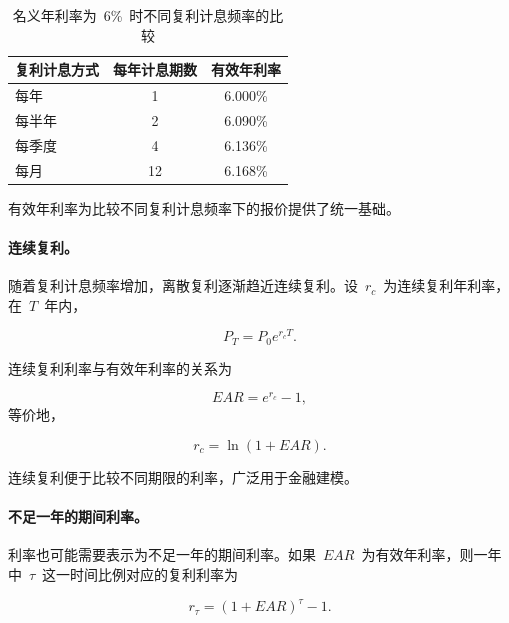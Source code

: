 \begin{table}[H]
\centering
\caption{名义年利率为~6\%~时不同复利计息频率的比较}
\label{tab:ch6-compounding-frequency}

\begin{tabular}{@{}l c c@{}}
\toprule
\textbf{复利计息方式} & \textbf{每年计息期数} & \textbf{有效年利率} \\
\midrule
每年 & 1 & 6.000\% \\
每半年 & 2 & 6.090\% \\
每季度 & 4 & 6.136\% \\
每月 & 12 & 6.168\% \\
\bottomrule
\end{tabular}
\end{table}

有效年利率为比较不同复利计息频率下的报价提供了统一基础。
\paragraph{连续复利。}

随着复利计息频率增加，离散复利逐渐趋近连续复利。设~$r_c$~为连续复利年利率，在~$T$~年内，

\begin{equation}
P_T=P_0 e^{r_c T}.
\label{eq:ch6-continuous-compounding}
\end{equation}

连续复利利率与有效年利率的关系为

\begin{equation}
EAR=e^{r_c}-1,
\label{eq:ch6-continuous-to-ear}
\end{equation}
等价地，

\begin{equation}
r_c=\ln(1+EAR).
\label{eq:ch6-ear-to-continuous}
\end{equation}

连续复利便于比较不同期限的利率，广泛用于金融建模。

\paragraph{不足一年的期间利率。}

利率也可能需要表示为不足一年的期间利率。如果~$EAR$~为有效年利率，则一年中~$\tau$~这一时间比例对应的复利利率为

\begin{equation}
r_{\tau}=(1+EAR)^{\tau}-1.
\label{eq:ch6-fractional-period-rate}
\end{equation}

